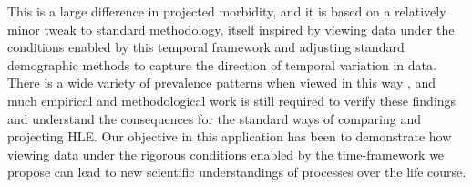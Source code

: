 \documentclass[12pt,oneside,a4paper]{article} %
\begin{document}
This is a large difference in projected morbidity, and it is based on a
relatively minor tweak to standard methodology, itself inspired by viewing data under the conditions
enabled by this temporal framework and adjusting standard demographic methods
to capture the direction of temporal variation in data. There is a wide variety
of prevalence patterns when viewed in this way \citep{riffe2015ttd,
wolf2015disability}, and much empirical and methodological work is still required to verify
these findings and understand the consequences for the standard ways of
comparing and projecting HLE. Our objective in this application has been
to demonstrate how viewing data under the rigorous conditions enabled by the
time-framework we propose can lead to new scientific understandings of
processes over the life course.




\end{document}
